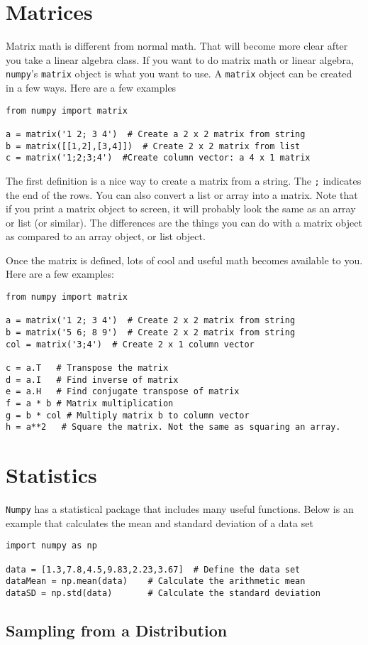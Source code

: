 \section{Matrices}
Matrix math is different from normal math.  That will become more
clear after you take a linear algebra class.  If you want to do matrix
math or linear algebra, \texttt{numpy}'s \texttt{matrix} object is what you
want to use.  A \texttt{matrix} object can be created in a few ways.  Here are
a few examples
\begin{Verbatim}
from numpy import matrix

a = matrix('1 2; 3 4')  # Create a 2 x 2 matrix from string
b = matrix([[1,2],[3,4]])  # Create 2 x 2 matrix from list
c = matrix('1;2;3;4')  #Create column vector: a 4 x 1 matrix
\end{Verbatim}
The first definition is a nice way to create a matrix from a string.
The \texttt{;} indicates the end of the rows.  You can also convert a
list or array into a matrix.  Note that if you print a matrix object
to screen, it will probably look the same as an array or list (or
similar).  The differences are the things you can do with a matrix
object as compared to an array object, or list object.

Once the matrix is defined, lots of cool and useful math becomes
available to you.  Here are a few examples:

\begin{Verbatim}
from numpy import matrix

a = matrix('1 2; 3 4')  # Create 2 x 2 matrix from string
b = matrix('5 6; 8 9')  # Create 2 x 2 matrix from string
col = matrix('3;4')  # Create 2 x 1 column vector

c = a.T   # Transpose the matrix
d = a.I   # Find inverse of matrix
e = a.H   # Find conjugate transpose of matrix
f = a * b # Matrix multiplication
g = b * col # Multiply matrix b to column vector
h = a**2   # Square the matrix. Not the same as squaring an array.
\end{Verbatim}
 

\section{Statistics}
\texttt{Numpy} has a statistical package that includes many useful
functions.  Below is an example that calculates the mean and standard
deviation of a data set
\begin{Verbatim}
import numpy as np

data = [1.3,7.8,4.5,9.83,2.23,3.67]  # Define the data set
dataMean = np.mean(data)    # Calculate the arithmetic mean
dataSD = np.std(data)       # Calculate the standard deviation
\end{Verbatim}

\subsection*{Sampling from a Distribution}